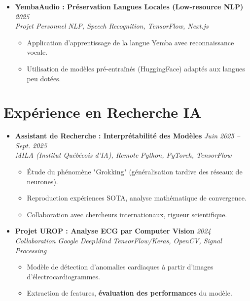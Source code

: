 \documentclass[a4paper,11pt]{article}
\begin{document}
\begin{itemize}[leftmargin=*, label={-}]
\item \textbf{YembaAudio : Préservation Langues Locales (Low-resource NLP)} \hfill \textit{2025} \\
\textit{Projet Personnel} \hfill \textit{NLP, Speech Recognition, TensorFlow, Next.js}
\vspace{-2pt}
    \begin{itemize}[leftmargin=0.4cm, nosep, label=\tiny$\bullet$]
        \item \small{Application d'apprentissage de la langue Yemba avec reconnaissance vocale.}
        \item \small{Utilisation de modèles pré-entraînés (HuggingFace) adaptés aux langues peu dotées.}
    \end{itemize}

\end{itemize}

\section{Expérience en Recherche IA}
\begin{itemize}[leftmargin=*, label={-}]

\item \textbf{Assistant de Recherche : Interprétabilité des Modèles} \hfill \textit{Juin 2025 -- Sept. 2025} \\
\textit{MILA (Institut Québécois d'IA), Remote} \hfill \textit{Python, PyTorch, TensorFlow}
\vspace{-2pt}
    \begin{itemize}[leftmargin=0.4cm, nosep, label=\tiny$\bullet$]
        \item \small{Étude du phénomène "Grokking" (généralisation tardive des réseaux de neurones).}
        \item \small{Reproduction expériences SOTA, analyse mathématique de convergence.}
        \item \small{Collaboration avec chercheurs internationaux, rigueur scientifique.}
    \end{itemize}
\vspace{3pt}

\item \textbf{Projet UROP : Analyse ECG par Computer Vision} \hfill \textit{2024} \\
\textit{Collaboration Google DeepMind} \hfill \textit{TensorFlow/Keras, OpenCV, Signal Processing}
\vspace{-2pt}
    \begin{itemize}[leftmargin=0.4cm, nosep, label=\tiny$\bullet$]
        \item \small{Modèle de détection d'anomalies cardiaques à partir d'images d'électrocardiogrammes.}
        \item \small{Extraction de features, \textbf{évaluation des performances} du modèle.}
    \end{itemize}

\end{itemize}
\end{document}
